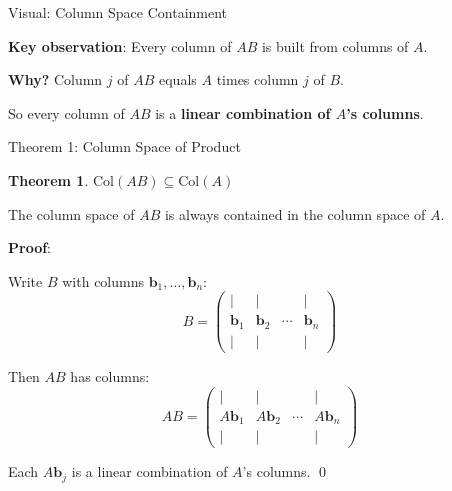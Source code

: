 \documentclass[10pt]{beamer}
\theoremstyle{definition}
\newtheorem{thm}{Theorem}[section]
\newcommand{\x}[1]{\alert{\textbf{#1}}}
\begin{document}
\begin{frame}{Visual: Column Space Containment}

\x{Key observation}: Every column of $AB$ is built from columns of $A$.

\vspace{1em}

\begin{center}
\end{center}

\vspace{0.5em}

\x{Why?} Column $j$ of $AB$ equals $A$ times column $j$ of $B$.

So every column of $AB$ is a \x{linear combination of $A$'s columns}.

\end{frame}

\begin{frame}{Theorem 1: Column Space of Product}

\begin{thm}
$\text{Col}(AB) \subseteq \text{Col}(A)$

The column space of $AB$ is always contained in the column space of $A$.
\end{thm}

\vspace{1em}

\x{Proof}:

Write $B$ with columns $\mathbf{b}_1, \ldots, \mathbf{b}_n$:
$$B = \begin{pmatrix} | & | & & | \\ \mathbf{b}_1 & \mathbf{b}_2 & \cdots & \mathbf{b}_n \\ | & | & & | \end{pmatrix}$$

Then $AB$ has columns:
$$AB = \begin{pmatrix} | & | & & | \\ A\mathbf{b}_1 & A\mathbf{b}_2 & \cdots & A\mathbf{b}_n \\ | & | & & | \end{pmatrix}$$

Each $A\mathbf{b}_j$ is a linear combination of $A$'s columns. \qed

\end{frame}
\end{document}
